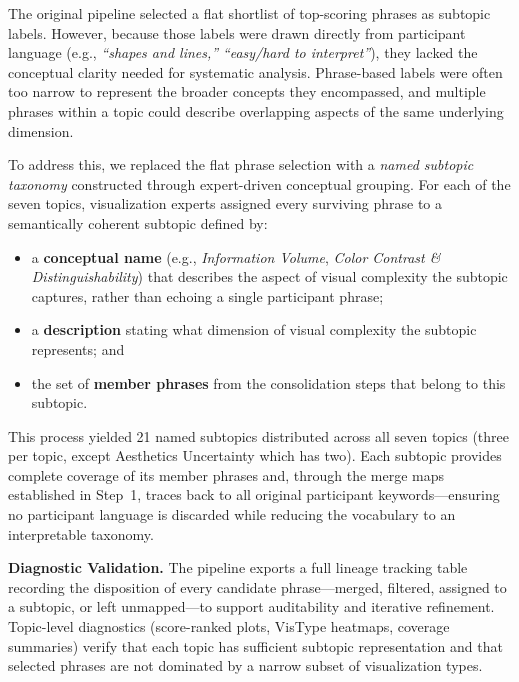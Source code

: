 \documentclass[journal]{IEEEtran}
\begin{document}
The original pipeline selected a flat shortlist of top-scoring phrases as subtopic labels. However, because those labels were drawn directly from participant language (e.g., \textit{``shapes and lines,''} \textit{``easy/hard to interpret''}), they lacked the conceptual clarity needed for systematic analysis. Phrase-based labels were often too narrow to represent the broader concepts they encompassed, and multiple phrases within a topic could describe overlapping aspects of the same underlying dimension.

To address this, we replaced the flat phrase selection with a \emph{named subtopic taxonomy} constructed through expert-driven conceptual grouping. For each of the seven topics, visualization experts assigned every surviving phrase to a semantically coherent subtopic defined by:
\begin{itemize}
  \item a \textbf{conceptual name} (e.g., \textit{Information Volume}, \textit{Color Contrast \& Distinguishability}) that describes the aspect of visual complexity the subtopic captures, rather than echoing a single participant phrase;
  \item a \textbf{description} stating what dimension of visual complexity the subtopic represents; and
  \item the set of \textbf{member phrases} from the consolidation steps that belong to this subtopic.
\end{itemize}

This process yielded 21 named subtopics distributed across all seven topics (three per topic, except Aesthetics Uncertainty which has two). Each subtopic provides complete coverage of its member phrases and, through the merge maps established in Step~1, traces back to all original participant keywords---ensuring no participant language is discarded while reducing the vocabulary to an interpretable taxonomy.

\noindent\textbf{Diagnostic Validation.}
The pipeline exports a full lineage tracking table recording the disposition of every candidate phrase---merged, filtered, assigned to a subtopic, or left unmapped---to support auditability and iterative refinement. Topic-level diagnostics (score-ranked plots, VisType heatmaps, coverage summaries) verify that each topic has sufficient subtopic representation and that selected phrases are not dominated by a narrow subset of visualization types.

\end{document}
